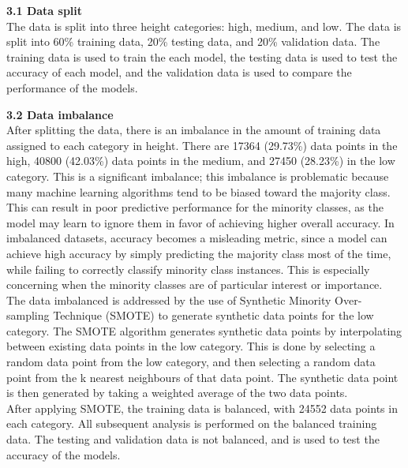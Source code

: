 \documentclass[12pt]{article}
\begin{document}
\vspace{20pt}

\textbf{3.1 Data split}
\\
The data is split into three height categories: high, medium, and low. The data is split into 60\% training data, 20\% testing data, and 20\% validation data. The training data is used to train the each model, the testing data is used to test the accuracy of each model, and the validation data is used to compare the performance of the models. 

\vspace{20pt}

\textbf{3.2 Data imbalance}
\\
After splitting the data, there is an imbalance in the amount of training data assigned to each category in height. There are 17364 (29.73\%) data points in the high, 40800 (42.03\%) data points in the medium, and 27450 (28.23\%) in the low category. This is a significant imbalance; this imbalance is problematic because many machine learning algorithms tend to be biased toward the majority class. This can result in poor predictive performance for the minority classes, as the model may learn to ignore them in favor of achieving higher overall accuracy. In imbalanced datasets, accuracy becomes a misleading metric, since a model can achieve high accuracy by simply predicting the majority class most of the time, while failing to correctly classify minority class instances. This is especially concerning when the minority classes are of particular interest or importance.
\\
The data imbalanced is addressed by the use of Synthetic Minority Over-sampling Technique (SMOTE) to generate synthetic data points for the low category. The SMOTE algorithm generates synthetic data points by interpolating between existing data points in the low category. This is done by selecting a random data point from the low category, and then selecting a random data point from the k nearest neighbours of that data point. The synthetic data point is then generated by taking a weighted average of the two data points.
\\
After applying SMOTE, the training data is balanced, with 24552 data points in each category. All subsequent analysis is performed on the balanced training data. The testing and validation data is not balanced, and is used to test the accuracy of the models.
 
\vspace{20pt}
\end{document}

